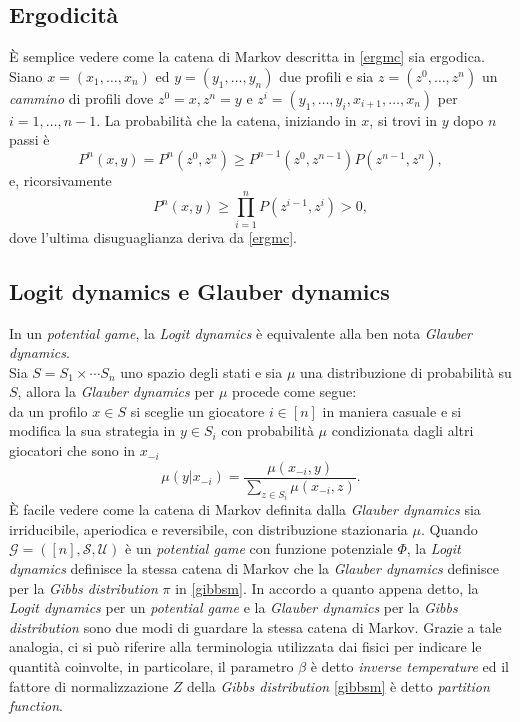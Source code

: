 \subsection{Ergodicità} \label{ssec:ergod}
È semplice vedere come la catena di Markov descritta in \ref{ergmc} sia ergodica. Siano $x = (x_1, \dots, x_n)$ ed $y = (y_1, \dots, y_n)$ due profili e sia $z=(z^0, \dots, z^n)$ un \textit{cammino} di profili dove $z^0 = x, z^n = y$ e $z^i=(y_1, \dots, y_i, x_{i+1}, \dots, x_n)$ per $i=1, \dots, n-1$. La probabilità che la catena, iniziando in $x$, si trovi in $y$ dopo $n$ passi è
\begin{equation}
	P^n(x,y) = P^n(z^0, z^n) \geq P^{n-1}(z^0, z^{n-1})P(z^{n-1}, z^n),
\end{equation}
e, ricorsivamente
\begin{equation}
	P^n(x,y) \geq \prod_{i=1}^{n}{P(z^{i-1}, z^i)} > 0,
\end{equation}
dove l'ultima disuguaglianza deriva da \ref{ergmc}.

\subsection{Logit dynamics e Glauber dynamics}
In un \textit{potential game}, la \textit{Logit dynamics} è equivalente alla ben nota \textit{Glauber dynamics}.\\
Sia $S = S_1 \times \cdots S_n$ uno spazio degli stati e sia $\mu$ una distribuzione di probabilità su $S$, allora la \textit{Glauber dynamics} per $\mu$ procede come segue:\\
da un profilo $x \in S$ si sceglie un giocatore $i \in [n]$ in maniera casuale e si modifica la sua strategia in $y \in S_i$ con probabilità $\mu$ condizionata dagli altri giocatori che sono in $x_{-i}$
\begin{equation}
	\mu(y|x_{-i}) = \frac{\mu(x_{-i}, y)}{\sum_{z\in S_i}{\mu(x_{-i}, z)}}.
\end{equation}
È facile vedere come la catena di Markov definita dalla \textit{Glauber dynamics} sia irriducibile, aperiodica e reversibile, con distribuzione stazionaria $\mu$. Quando $\mathcal{G}=([n], \mathcal{S}, \mathcal{U})$ è un \textit{potential game} con funzione potenziale $\Phi$, la \textit{Logit dynamics} definisce la stessa catena di Markov che la \textit{Glauber dynamics} definisce per la \textit{Gibbs distribution} $\pi$ in \ref{gibbsm}.
In accordo a quanto appena detto, la \textit{Logit dynamics} per un \textit{potential game} e la \textit{Glauber dynamics} per la \textit{Gibbs distribution} sono due modi di guardare la stessa catena di Markov. Grazie a tale analogia, ci si può riferire alla terminologia utilizzata dai fisici per indicare le quantità coinvolte, in particolare, il parametro $\beta$ è detto \textit{inverse temperature} ed il fattore di normalizzazione $Z$ della \textit{Gibbs distribution} \ref{gibbsm} è detto \textit{partition function}.
